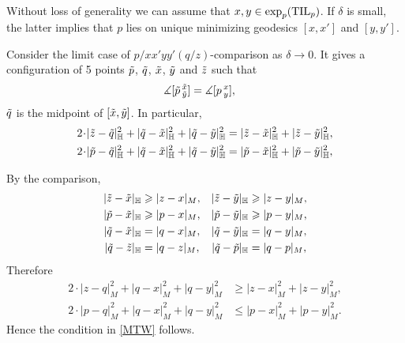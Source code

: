 Without loss of generality we can assume that $x,y\zz\in\exp_p(\TIL_p)$.
If $\delta$ is small, the latter implies that $p$ lies on unique minimizing geodesics $[x,x']$ and $[y,y']$.

Consider the limit case of $p/xx'yy'(q/z)$-comparison  as $\delta\to 0$.
It gives a configuration of 5 points $\~p$, $\~q$, $\~x$, $\~y$ and $\~z$ such that
\begin{align*}
\measuredangle[\~p\,^{\~x}_{\~y}]&=\measuredangle[p\,^x_y],
\end{align*}
$\~q$ is the midpoint of $[\~x, \~y]$.
In particular,
\begin{align*}
2\cdot|\~z-\~q|_\HH^2+|\~q-\~x|_\HH^2+|\~q-\~y|_\HH^2
&=
|\~z-\~x|_\HH^2+|\~z-\~y|_\HH^2,
\\
2\cdot|\~p-\~q|_\HH^2+|\~q-\~x|_\HH^2+|\~q-\~y|_\HH^2
&=
|\~p-\~x|_\HH^2+|\~p-\~y|_\HH^2,
\end{align*}

By the comparison,
\begin{align*}
|\~z-\~x|_\HH&\ge |z-x|_M,
&
|\~z-\~y|_\HH&\ge |z-y|_M,
\\
|\~p-\~x|_\HH&\ge |p-x|_M,
&
|\~p-\~y|_\HH&\ge |p-y|_M,
\\
|\~q-\~x|_\HH&= |q-x|_M,
&
|\~q-\~y|_\HH&= |q-y|_M,
\\
|\~q-\~z|_\HH&= |q-z|_M,
&
|\~q-\~p|_\HH&= |q-p|_M,
\end{align*}
Therefore
\begin{align*}
2\cdot|z-q|_M^2+|q-x|_M^2+|q-y|_M^2
&\ge
|z-x|_M^2+|z-y|_M^2,
\\
2\cdot|p-q|_M^2+|q-x|_M^2+|q-y|_M^2
&\le
|p-x|_M^2+|p-y|_M^2.
\end{align*}
Hence the condition in \ref{MTW} follows.
\qeds


